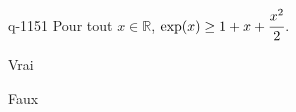 \begin{truefalse}{q-1151}
Pour tout $x\in\mathbb{R}$, $\exp(x)\geq 1+x+\cfrac{x^2}{2}$.
\item Vrai
\item* Faux
\end{truefalse}

